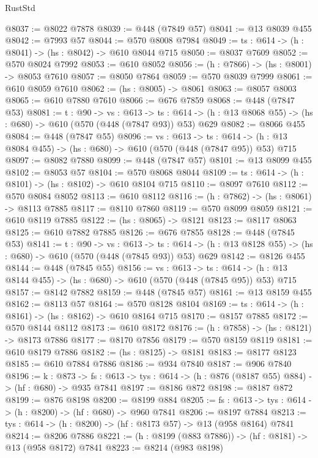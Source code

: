 \begin{lexlean}{RustStd}
\begin{coremodule}
@8037 := @8022 @7878
@8039 := @448 (@7849 @57)
@8041 := @13 @8039 @455
@8042 := @7993 @57
@8044 := @570 @8008 @7984
@8049 := {ts : @614} -> (h : @8041) -> (hs : @8042) -> @610 @8044 @715
@8050 := @8037 @7609
@8052 := @570 @8024 @7992
@8053 := @610 @8052
@8056 := (h : @7866) -> (hs : @8001) -> @8053 @7610
@8057 := @8050 @7864
@8059 := @570 @8039 @7999
@8061 := @610 @8059 @7610
@8062 := (hs : @8005) -> @8061
@8063 := @8057 @8003
@8065 := @610 @7880 @7610
@8066 := @676 @7859
@8068 := @448 (@7847 @53)
@8081 := {t : @90} ->
  {vs : @613} ->
  {ts : @614} -> (h : @13 @8068 @55) -> (hs : @680) -> @610 (@570 (@448 (@7847 @93)) @53) @629
@8082 := @8066 @455
@8084 := @448 (@7847 @55)
@8096 := {vs : @613} ->
  {ts : @614} -> (h : @13 @8084 @455) -> (hs : @680) -> @610 (@570 (@448 (@7847 @95)) @53) @715
@8097 := @8082 @7880
@8099 := @448 (@7847 @57)
@8101 := @13 @8099 @455
@8102 := @8053 @57
@8104 := @570 @8068 @8044
@8109 := {ts : @614} -> (h : @8101) -> (hs : @8102) -> @610 @8104 @715
@8110 := @8097 @7610
@8112 := @570 @8084 @8052
@8113 := @610 @8112
@8116 := (h : @7862) -> (hs : @8061) -> @8113 @7885
@8117 := @8110 @7860
@8119 := @570 @8099 @8059
@8121 := @610 @8119 @7885
@8122 := (hs : @8065) -> @8121
@8123 := @8117 @8063
@8125 := @610 @7882 @7885
@8126 := @676 @7855
@8128 := @448 (@7845 @53)
@8141 := {t : @90} ->
  {vs : @613} ->
  {ts : @614} -> (h : @13 @8128 @55) -> (hs : @680) -> @610 (@570 (@448 (@7845 @93)) @53) @629
@8142 := @8126 @455
@8144 := @448 (@7845 @55)
@8156 := {vs : @613} ->
  {ts : @614} -> (h : @13 @8144 @455) -> (hs : @680) -> @610 (@570 (@448 (@7845 @95)) @53) @715
@8157 := @8142 @7882
@8159 := @448 (@7845 @57)
@8161 := @13 @8159 @455
@8162 := @8113 @57
@8164 := @570 @8128 @8104
@8169 := {ts : @614} -> (h : @8161) -> (hs : @8162) -> @610 @8164 @715
@8170 := @8157 @7885
@8172 := @570 @8144 @8112
@8173 := @610 @8172
@8176 := (h : @7858) -> (hs : @8121) -> @8173 @7886
@8177 := @8170 @7856
@8179 := @570 @8159 @8119
@8181 := @610 @8179 @7886
@8182 := (hs : @8125) -> @8181
@8183 := @8177 @8123
@8185 := @610 @7884 @7886
@8186 := @934 @7840
@8187 := @906 @7840
@8196 := {k : @873} ->
  {fs : @613} -> {tys : @614} -> (h : @876 (@8187 @55) @884) -> (hf : @680) -> @935 @7841
@8197 := @8186 @872
@8198 := @8187 @872
@8199 := @876 @8198
@8200 := @8199 @884
@8205 := {fs : @613} -> {tys : @614} -> (h : @8200) -> (hf : @680) -> @960 @7841
@8206 := @8197 @7884
@8213 := {tys : @614} -> (h : @8200) -> (hf : @8173 @57) -> @13 (@958 @8164) @7841
@8214 := @8206 @7886
@8221 := (h : @8199 (@883 @7886)) -> (hf : @8181) -> @13 (@958 @8172) @7841
@8223 := @8214 (@983 @8198)

\end{coremodule}
\end{lexlean}
